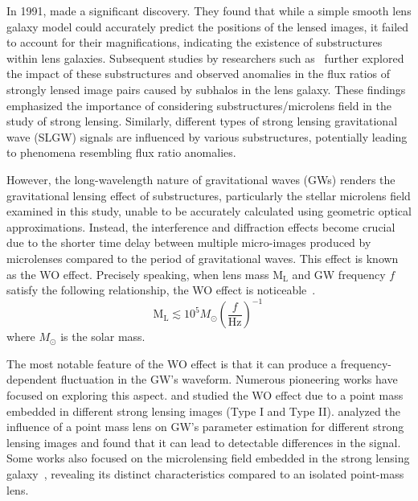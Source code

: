 \documentclass[fleqn,usenatbib]{mnras}
\begin{document}
In 1991, \citet{1991ApJ...373..354K} made a significant discovery.
They found that while a simple smooth lens galaxy model could accurately predict the positions of the lensed images, it failed to account for their magnifications, indicating the existence of substructures within lens galaxies. 
Subsequent studies by researchers such as~\citet{Mao:1997ek, Metcalf:2001ap, Chiba:2001wk, Dalal:2001fq, Metcalf:2001es, Keeton:2002qt, Kochanek:2003zc, Bradac:2003hy} further explored the impact of these substructures and observed anomalies in the flux ratios of strongly lensed image pairs caused by subhalos in the lens galaxy.
These findings emphasized the importance of considering substructures/microlens field in the study of strong lensing.
Similarly, different types of strong lensing gravitational wave (SLGW) signals are influenced by various substructures, potentially leading to phenomena resembling flux ratio anomalies.

However, the long-wavelength nature of gravitational waves (GWs) renders the gravitational lensing effect of substructures, particularly the stellar microlens field examined in this study, unable to be accurately calculated using geometric optical approximations.
Instead, the interference and diffraction effects become crucial due to the shorter time delay between multiple micro-images produced by microlenses compared to the period of gravitational waves.
This effect is known as the WO effect.
Precisely speaking, when lens mass $\mathrm{M}_\mathrm{L}$ and GW frequency $f$ satisfy the following relationship, the WO effect is noticeable~\citep{Takahashi:2003ix}.
\begin{equation}
\label{eq:geo_wo}
\mathrm{M}_\mathrm{L} \lesssim 10^{5} M_{\odot}\left(\frac{f}{\mathrm{Hz}}\right)^{-1} \,
\end{equation}
where $M_{\odot}$ is the solar mass.

The most notable feature of the WO effect is that it can produce a frequency-dependent fluctuation in the GW's waveform.
Numerous pioneering works have focused on exploring this aspect.
\citet{Cheung:2020okf} and \citet{Yeung:2021roe} studied the WO effect due to a point mass embedded in different strong lensing images (Type I and Type II).
\citet{Meena:2019ate} analyzed the influence of a point mass lens on GW's parameter estimation for different strong lensing images and found that it can lead to detectable differences in the signal. 
Some works also focused on the microlensing field embedded in the strong lensing galaxy~\citep[e.g.,][]{2019Diego,2021Anuj, Meena:2022unp, Shan:2022xfx, Shan:2023ngi, Savastano:2023spl,Mishra:2023ddt}, revealing its distinct characteristics compared to an isolated point-mass lens.
\end{document}
